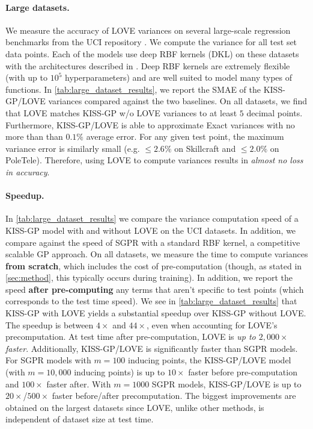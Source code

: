 \paragraph{Large datasets.}
We measure the accuracy of LOVE{} variances on several large-scale regression benchmarks from the UCI repository \cite{asuncion2007uci}.
We compute the variance for all test set data points.
Each of the models use deep RBF kernels (DKL) on these datasets with the architectures described in \cite{wilson2016deep}.
Deep RBF kernels are extremely flexible (with up to $10^5$ hyperparameters) and are well suited to model many types of functions.
In \autoref{tab:large_dataset_results}, we report the SMAE of the KISS-GP/LOVE{} variances compared against the two baselines.
On all datasets, we find that LOVE{} matches KISS-GP w/o LOVE{} variances to at least $5$ decimal points.
Furthermore, KISS-GP/LOVE{} is able to approximate Exact variances with no more than than $0.1\%$ average error.
For any given test point, the maximum variance error is similarly small (e.g. $\leq \! 2.6\%$ on Skillcraft and $\leq \! 2.0\%$ on PoleTele).
Therefore, using LOVE{} to compute variances results in \emph{almost no loss in accuracy}.

\paragraph{Speedup.}
In \autoref{tab:large_dataset_results} we compare the variance computation speed of a KISS-GP model with and without LOVE{} on the UCI datasets.
In addition, we compare against the speed of SGPR with a standard RBF kernel, a competitive scalable GP approach.
On all datasets, we measure the time to compute variances {\bf from scratch}, which includes the cost of pre-computation (though, as stated in \autoref{sec:method}, this typically occurs during training).
In addition, we report the speed {\bf after pre-computing} any terms that aren't specific to test points (which corresponds to the test time speed).
We see in \autoref{tab:large_dataset_results} that KISS-GP with LOVE{} yields a substantial speedup over KISS-GP without LOVE{}.
The speedup is between $4\times$ and $44\times$, even when accounting for LOVE{}'s precomputation.
At test time after pre-computation, LOVE{} is \emph{up to $2,\!000\times$ faster}.
Additionally, KISS-GP/LOVE{} is significantly faster than SGPR models.
For SGPR models with $m=100$ inducing points, the KISS-GP/LOVE{} model (with $m=10,\!000$ inducing points) is up to $10\times$ faster before pre-computation and $100\times$ faster after.
With $m=1000$ SGPR models, KISS-GP/LOVE{} is up to $20\times$/$500\times$ faster before/after precomputation.
The biggest improvements are obtained on the largest datasets since LOVE{}, unlike other methods, is independent of dataset size at test time.

